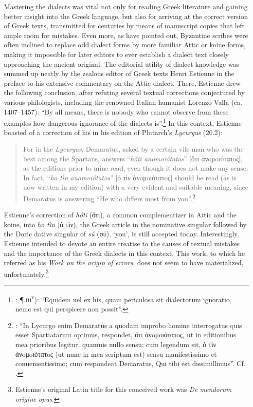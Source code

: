Mastering the dialects was vital not only for reading Greek literature and gaining better insight into the Greek language, but also for arriving at the correct version of Greek texts, transmitted for centuries by means of manuscript copies that left ample room for mistakes. Even more, as \citet[47-48]{Reynolds1991} have pointed out, Byzantine scribes were often inclined to replace odd dialect forms by more familiar Attic or koine forms, making it impossible for later editors to ever establish a dialect text closely approaching the ancient original. The editorial utility of dialect knowledge was summed up neatly by the zealous editor of Greek texts Henri Estienne in the preface to his extensive commentary on the Attic dialect. There, Estienne drew the following conclusion, after refuting several textual corrections conjectured by various philologists, including the renowned Italian humanist Lorenzo Valla (ca. 1407–1457): “By all means, there is nobody who cannot observe from these examples how dangerous ignorance of the dialects is”.\footnote{\citet{Estienne1573}: ¶.iii\textsc{\textsuperscript{v}}): “Equidem uel ex his, quam periculosa sit dialectorum ignoratio, nemo est qui perspicere non possit”.} In this context, Estienne boasted of a correction of his in his edition of Plutarch’s \textit{Lycurgus} (20.2):

\begin{quote}
For in the \textit{Lycurgus}, Demaratus, asked by a certain vile man who was the best among the Spartans, answers “\textit{hóti anomoiótatos}” [ὅτι ἀνoμoιότατoς], as the editions prior to mine read, even though it does not make any sense. In fact, “\textit{ho tìn anomoiótatos}” [ὁ τὶν ἀνoμoιότατoς] should be read (as is now written in my edition) with a very evident and suitable meaning, since Demaratus is answering “He who differs most from you”.\footnote{\citet[¶.iii\textsc{\textsuperscript{v}}]{Estienne1573}: “In Lycurgo enim Demaratus a quodam improbo homine interrogatus quis esset Spartiatarum optimus, respondet, ὅτι ἀνoμoιότατoς, ut in editionibus mea prioribus legitur, quamuis nullo sensu; cum legendum sit, ὁ τὶν ἀνoμoιότατoς (ut nunc in mea scriptum est) sensu manifestissimo et conuenientissimo; cum respondeat Demaratus, Qui tibi est dissimillimus”. Cf. \citet[36, 43–44]{Estienne1581}.}
\end{quote}

Estienne’s correction of \textit{hóti} (ὅτι), a common complementizer in Attic and the koine, into \textit{ho tìn} (ὁ τὶν), the Greek article in the nominative singular followed by the Doric dative singular of \textit{sú} (σύ), ‘you’, is still accepted today. Interestingly, Estienne intended to devote an entire treatise to the causes of textual mistakes and the importance of the Greek dialects in this context. This work, to which he referred as his \textit{Work on the origin of errors}, does not seem to have materialized, unfortunately.\footnote{Estienne’s original Latin title for this conceived work was \textit{De mendorum origine opus}.}


